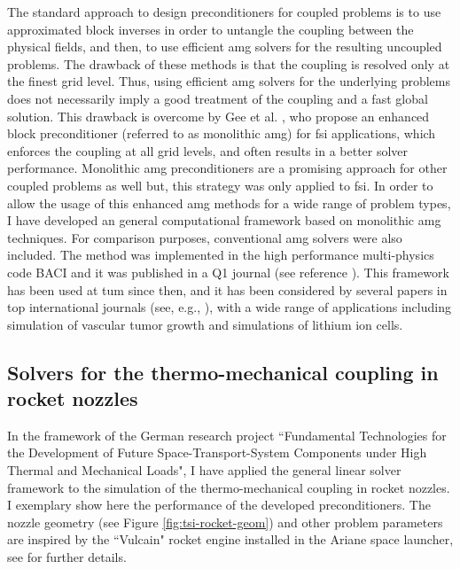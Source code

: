 \documentclass{article}
\newcommand{\bemph}[1]{#1}
\begin{document}
The standard approach to design preconditioners for coupled problems is to use approximated block inverses in order to untangle the coupling between the physical fields, and then, to use efficient \ac{amg} solvers for the resulting uncoupled problems. The drawback of these methods is that the coupling is resolved only at the finest grid level. Thus, using efficient \ac{amg} solvers for the underlying problems does not necessarily imply a good treatment of the coupling and a fast global solution. This drawback is overcome by Gee et al. \cite{Gee2011}, who propose an enhanced block preconditioner (referred to as monolithic \ac{amg}) for \ac{fsi} applications, which enforces the coupling at all grid levels, and often results in a better solver performance. Monolithic \ac{amg} preconditioners are a promising approach for other coupled problems as well but, this strategy was only applied to \ac{fsi}. In order to allow the usage of this enhanced \ac{amg} methods for a wide range of problem types, \bemph{I have developed an general computational framework based on monolithic \ac{amg} techniques}. For comparison purposes, conventional \ac{amg} solvers were also included. The method was implemented in the high performance multi-physics code BACI and \bemph{it was published in a Q1 journal} (see reference \cite{verdugo_unified_2016}). This framework has been used at \ac{tum} since then, and \bemph{it has been considered by several papers in top international journals} (see, e.g., \cite{Kremheller2018,Fang2018}), with a wide range of applications including  simulation of vascular tumor growth and simulations of lithium ion cells.


\subsection{Solvers for the thermo-mechanical coupling in rocket nozzles}

In the framework of the \bemph{German research project} ``Fundamental Technologies for the Development of Future Space-Transport-System Components under High Thermal and Mechanical Loads", I have applied the general linear solver framework to the simulation of the thermo-mechanical coupling in rocket nozzles. I exemplary show here the performance of the developed preconditioners. The nozzle geometry  (see Figure \ref{fig:tsi-rocket-geom}) and other problem parameters are inspired by the ``Vulcain" rocket engine installed in the Ariane space launcher, see  \cite{verdugo_unified_2016} for further details.
\end{document}
